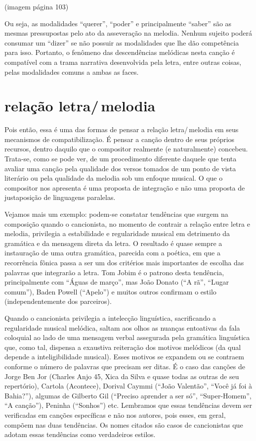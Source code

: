 (imagem página 103)

Ou seja, as modalidades ``querer'', ``poder'' e principalmente ``saber''
são as mesmas pressupostas pelo ato da asseveração na melodia. Nenhum
sujeito poderá consumar um ``dizer'' se não possuir as modalidades que
lhe dão competência para isso. Portanto, o fenômeno das descendências
melódicas nesta canção é compatível com a trama narrativa desenvolvida
pela letra, entre outras coisas, pelas modalidades comuns a ambas as
faces.

\section{relação letra/\,melodia}

Pois então, essa é uma das formas de pensar a relação letra/\,melodia em
seus mecanismos de compatibilização. É pensar a canção dentro de seus
próprios recursos, dentro daquilo que o compositor realmente (e
naturalmente) concebeu. Trata-se, como se pode ver, de um procedimento
diferente daquele que tenta avaliar uma canção pela qualidade dos versos
tomados de um ponto de vista literário ou pela qualidade da melodia sob
um enfoque musical. O que o compositor nos apresenta é uma proposta de
integração e não uma proposta de justaposição de linguagens paralelas.

Vejamos mais um exemplo: podem-se constatar tendências que surgem na
composição quando o cancionista, no momento de contrair a relação entre
letra e melodia, privilegia a estabilidade e regularidade musical em
detrimento da gramática e da mensagem direta da letra. O resultado é
quase sempre a instauração de uma outra gramática, parecida com a
poética, em que a recorrência fônica passa a ser um dos critérios mais
importantes de escolha das palavras que integrarão a letra. Tom Jobim é
o patrono desta tendência, principalmente com ``Águas de março'', mas João
Donato (``A rã'', ``Lugar comum''), Baden Powell (``Apelo'') e muitos outros
confirmam o estilo (independentemente dos parceiros).

Quando o cancionista privilegia a intelecção linguística, sacrificando a
regularidade musical melódica, saltam aos olhos as nuanças entoativas da
fala coloquial ao lado de uma mensagem verbal assegurada pela gramática
linguística que, como tal, dispensa a exaustiva reiteração dos motivos
melódicos (da qual depende a inteligibilidade musical). Esses motivos se
expandem ou se contraem conforme o número de palavras que precisam ser
ditas. É o caso das canções de Jorge Ben Jor (Charles Anjo 45, Xica da
Silva e quase todas as outras de seu repertório), Cartola (Acontece),
Dorival Caymmi (``João Valentão'', ``Você já foi à Bahia?''), algumas de
Gilberto Gil (``Preciso aprender a ser só'', ``Super-Homem'', ``A canção''),
Peninha (``Sonhos'') etc. Lembramos que essas tendências devem ser
verificadas em canções específicas e não nos autores, pois esses, em
geral, compõem nas duas tendências. Os nomes citados são casos de
cancionistas que adotam essas tendências como verdadeiros estilos.

